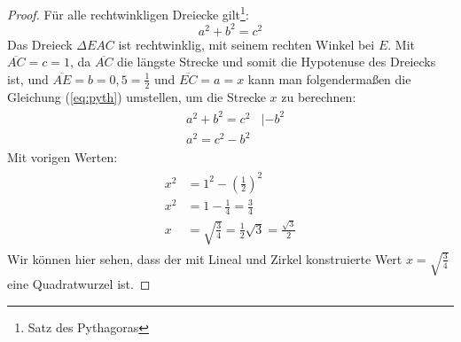 \begin{proof}
    Für alle rechtwinkligen Dreiecke gilt\footnote{Satz des Pythagoras}: \begin{equation}\label{eq:pyth}
        a^2+b^2=c^2
    \end{equation} Das Dreieck $\Delta EAC$ ist rechtwinklig, mit seinem rechten Winkel bei $E$. Mit $\overline{AC}=c=1$, da $\overline{AC}$ die längste Strecke und somit die Hypotenuse des Dreiecks ist, und $\overline{AE}=b=0,5=\frac{1}{2}$ und $\overline{EC}=a=x$ kann man folgendermaßen die Gleichung (\ref{eq:pyth}) umstellen, um die Strecke $x$ zu berechnen:
\begin{align*}
  \begin{split}
     &a^2+b^2=c^2 \ \ \ \ |-b^2 \\
     &a^2=c^2-b^2
  \end{split}
\end{align*}
\newpage
\noindent Mit vorigen Werten:
\begin{align*}
  \begin{split}
     x^2 &=1^2-\left(\frac{1}{2}\right)^2 \\
     x^2&=1-\frac{1}{4}=\frac{3}{4} \\
     x&= \sqrt{\frac{3}{4}}=\frac{1}{2}\sqrt{3}=\frac{\sqrt{3}}{2}
  \end{split}
\end{align*}
Wir können hier sehen, dass der mit Lineal und Zirkel konstruierte Wert $x=\sqrt{\frac{3}{4}}$ eine Quadratwurzel ist.\end{proof}
